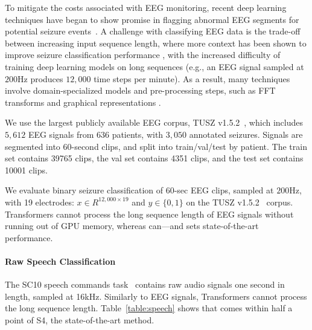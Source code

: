 To mitigate the costs associated with EEG monitoring, recent deep learning techniques have began to show promise in flagging abnormal EEG segments for potential seizure events~\citep{siddiqui2020review}. A challenge with classifying EEG data is the trade-off between increasing input sequence length, where more context has been shown to improve seizure classification performance \cite{saab2020weak}, with the increased difficulty of training deep learning models on long sequences (e.g., an EEG signal sampled at $200$Hz produces $12{,}000$ time steps per minute). As a result, many techniques involve domain-specialized models and pre-processing steps, such as FFT transforms and graphical representations \cite{tang2021self}.

We use the largest publicly available EEG corpus, TUSZ v1.5.2~\citep{shah2018temple}, which includes $5{,}612$ EEG signals from 636 patients, with $3{,}050$ annotated seizures.
Signals are segmented into 60-second clips, and split into train/val/test by patient.
The train set contains 39765 clips, the val set contains 4351 clips, and the test set contains 10001 clips.



We evaluate binary seizure classification of $60$-sec EEG clips, sampled at $200$Hz, with 19 electrodes: $ x \in R^{12{,}000 \times 19}$ and $y \in \{0,1\}$ on the TUSZ v1.5.2~\citep{shah2018temple} corpus.
Transformers cannot process the long sequence length of EEG signals without running out of GPU memory, whereas \hthree can---and sets state-of-the-art performance.

\paragraph{Raw Speech Classification}
The SC10 speech commands task~\citep{warden2018speech} contains raw audio signals one second in length, sampled at 16kHz.
Similarly to EEG signals, Transformers cannot process the long sequence length.
Table~\ref{table:speech} shows that \hthree comes within half a point of S4, the state-of-the-art method.


